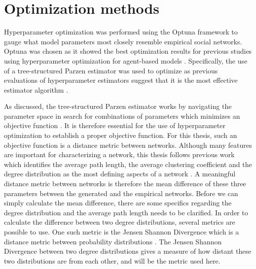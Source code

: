 \documentclass[11pt]{article}
\begin{document}
\section{Optimization methods}
Hyperparameter optimization was performed using the Optuna framework \cite{akiba_optuna_2019} to gauge what model parameters most closely resemble empirical social networks. Optuna was chosen as it showed the best optimization results for previous studies using hyperparameter optimization for agent-based models \cite{kerr2021covasim}. Specifically, the use of a tree-structured Parzen estimator was used to optimize as previous evaluations of hyperparameter estimators suggest that it is the most effective estimator algorithm \cite{akiba_optuna_2019, bergstra_algorithms_2011, hutter2014efficient}. 

As discussed, the tree-structured Parzen estimator works by navigating the parameter space in search for combinations of parameters which minimizes an objective function \cite{akiba_optuna_2019}. It is therefore essential for the use of hyperparameter optimization to establish a proper objective function. For this thesis, such an objective function is a distance metric between networks. Although many features are important for characterizing a network, this thesis follows previous work which identifies the average path length, the average clustering coefficient and the degree distribution as the most defining aspects of a network \cite{jackson_search_2004, jackson_meeting_2007}. A meaningful distance metric between networks is therefore the mean difference of these three parameters between the generated and the empirical networks.
Before we can simply calculate the mean difference, there are some specifics regarding the degree distribution and the average path length needs to be clarified.
In order to calculate the difference between two degree distributions, several metrics are possible to use. One such metric is the Jensen Shannon Divergence which is a distance metric between probability distributions \cite{fuglede_jensen-shannon_2004}. The Jensen Shannon Divergence between two degree distributions gives a measure of how distant these two distributions are from each other, and will be the metric used here. 
\end{document}
